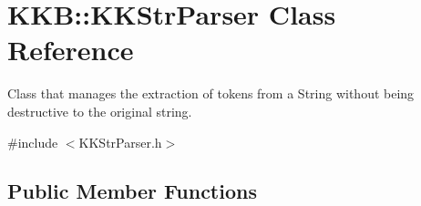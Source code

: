 \hypertarget{class_k_k_b_1_1_k_k_str_parser}{}\section{K\+KB\+:\+:K\+K\+Str\+Parser Class Reference}
\label{class_k_k_b_1_1_k_k_str_parser}


Class that manages the extraction of tokens from a String without being destructive to the original string.  




{\ttfamily \#include $<$K\+K\+Str\+Parser.\+h$>$}

\subsection*{Public Member Functions}

